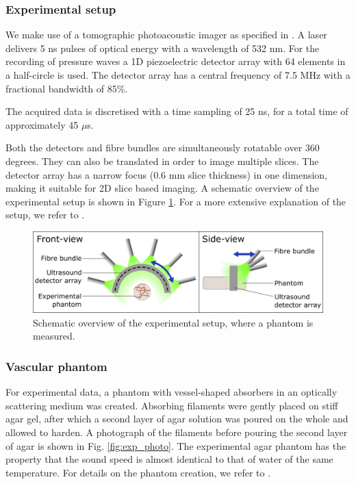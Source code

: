 \documentclass[journal]{IEEEtran}
\newcommand{\hl}[1]{\cbcolor{red}\begin{changebar}{\color{red} #1}\end{changebar}}
\begin{document}
\subsubsection{Experimental setup}
We make use of a tomographic photoacoustic imager as specified in \cite{Es2015}. A laser delivers 5 ns pulses of optical energy with a wavelength of 532 nm. For the recording of pressure waves a 1D piezoelectric detector array with 64 elements in a half-circle is used. The detector array has a central frequency of 7.5 MHz with a fractional bandwidth of 85\%. \hl{The acquired data is discretised with a time sampling of 25 ns, for a total time of approximately 45 $\mu$s.} Both the detectors and fibre bundles are simultaneously rotatable over 360 degrees. They can also be translated in order to image multiple slices. The detector array has a narrow focus (0.6 mm slice thickness) in one dimension, making it suitable for 2D slice based imaging. A schematic overview of the experimental setup is shown in Figure \ref{fig:exp_setup}. For a more extensive explanation of the setup, we refer to \cite{Es2015}. 

\begin{figure}[!ht]
\centering
\includegraphics[width=\linewidth]{images/Experimental_setup4.png}
\caption{Schematic overview of the experimental setup, where a phantom is measured.}
\label{fig:exp_setup}
\vspace{-5mm}
\end{figure}

\subsubsection{Vascular phantom}
For experimental data, a phantom with vessel-shaped absorbers in an optically scattering medium was created. Absorbing filaments were gently placed on stiff agar gel, after which a second layer of agar solution was poured on the whole and allowed to harden. A photograph of the filaments before pouring the second layer of agar is shown in Fig. \ref{fig:exp_photo}. {The experimental agar phantom has the property that the sound speed is almost identical to that of water of the same temperature.} For details on the phantom creation, we refer to \cite{Boink2018}. 
\end{document}
